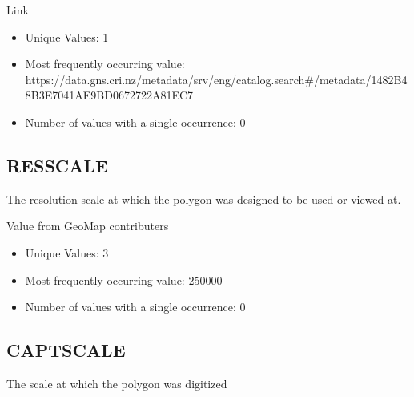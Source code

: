 \documentclass[letterpaper,10pt,english]{sphinxmanual}
\begin{document}
Link



\begin{itemize}
\item {} 
Unique Values: 1

\item {} 
Most frequently occurring value: https://data.gns.cri.nz/metadata/srv/eng/catalog.search\#/metadata/1482B48B\sphinxhyphen{}3E70\sphinxhyphen{}41AE\sphinxhyphen{}9BD0\sphinxhyphen{}672722A81EC7

\item {} 
Number of values with a single occurrence: 0

\end{itemize}


\subsection{RESSCALE}
\label{\detokenize{field_glossary:resscale}}
The resolution scale at which the polygon was designed to be used or viewed at.

Value from GeoMap contributers


\begin{itemize}
\item {} 
Unique Values: 3

\item {} 
Most frequently occurring value: 250000

\item {} 
Number of values with a single occurrence: 0

\end{itemize}


\subsection{CAPTSCALE}
\label{\detokenize{field_glossary:captscale}}
The scale at which the polygon was digitized
\end{document}
